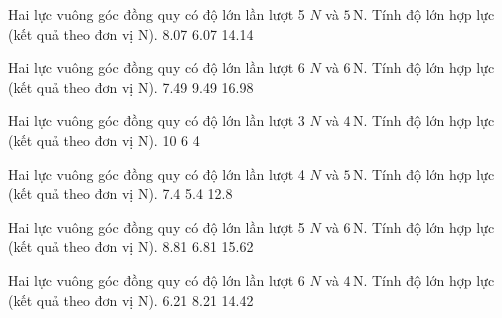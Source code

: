 \begin{ex}
Hai lực vuông góc đồng quy có độ lớn lần lượt 5 $N$ và $5\,\text{N}$. Tính độ lớn hợp lực (kết quả theo đơn vị N).
\choice
{8.07}
{}
{6.07}
{14.14}
\end{ex}

\begin{ex}
Hai lực vuông góc đồng quy có độ lớn lần lượt 6 $N$ và $6\,\text{N}$. Tính độ lớn hợp lực (kết quả theo đơn vị N).
\choice
{7.49}
{9.49}
{}
{16.98}
\end{ex}

\begin{ex}
Hai lực vuông góc đồng quy có độ lớn lần lượt 3 $N$ và $4\,\text{N}$. Tính độ lớn hợp lực (kết quả theo đơn vị N).
\choice
{10}
{6}
{4}
{}
\end{ex}

\begin{ex}
Hai lực vuông góc đồng quy có độ lớn lần lượt 4 $N$ và $5\,\text{N}$. Tính độ lớn hợp lực (kết quả theo đơn vị N).
\choice
{}
{7.4}
{5.4}
{12.8}
\end{ex}

\begin{ex}
Hai lực vuông góc đồng quy có độ lớn lần lượt 5 $N$ và $6\,\text{N}$. Tính độ lớn hợp lực (kết quả theo đơn vị N).
\choice
{8.81}
{}
{6.81}
{15.62}
\end{ex}

\begin{ex}
Hai lực vuông góc đồng quy có độ lớn lần lượt 6 $N$ và $4\,\text{N}$. Tính độ lớn hợp lực (kết quả theo đơn vị N).
\choice
{6.21}
{8.21}
{}
{14.42}
\end{ex}

